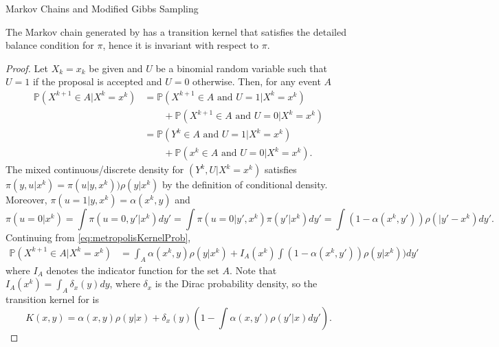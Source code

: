 \begin{chapter}{Markov Chains and Modified Gibbs Sampling}
\begin{prop} \label{prop:metropolisInvariance}
  The Markov chain generated by  has a transition kernel that satisfies the detailed balance condition for $\pi$, hence it is invariant with respect to $\pi$.
\end{prop}
\begin{proof}
Let $X_k=x_k$ be given and $U$ be a binomial random variable such that $U=1$ if the proposal is accepted and $U=0$ otherwise. 
Then, for any event $A$ 
\begin{align}
  \mathbb P\left( X^{k+1} \in A | X^k = x^k \right)
    &= \mathbb P\left( X^{k+1} \in A\text{ and } U = 1 |X^k=x^k \right) \nonumber\\
    &\quad\quad+ \mathbb P\left(X^{k+1} \in A\text{ and } U = 0| X^k=x^k \right) \nonumber \\
    &= \mathbb P\left( Y^k \in A\text{ and } U = 1 |X^k=x^k \right) \nonumber\\
    &\quad\quad+ \mathbb P\left(x^k \in A\text{ and } U = 0| X^k=x^k \right). \label{eq:metropolisKernelProb}
\end{align}
The mixed continuous/discrete density for $(Y^k,U|X^k = x^k)$ satisfies $\pi(y,u|x^k) = \pi(u|y,x^k))\rho(y|x^k)$ by the definition of conditional density.  
Moreover, $\pi(u=1|y,x^k) = \alpha(x^k,y)$ and 
\begin{equation*}
  \pi(u=0|x^k) = \int \pi(u=0,y'|x^k)dy' = \int \pi(u=0|y',x^k)\pi(y'|x^k)dy' = \int (1-\alpha(x^k,y'))\rho(|y'-x^k)dy'.
\end{equation*}
Continuing from \eqref{eq:metropolisKernelProb},
\begin{align}
  \mathbb P\left( X^{k+1} \in A | X^k = x^k \right)
    &= \int_A \alpha(x^k,y)\rho(y|x^k) + I_A(x^k) \int (1 - \alpha(x^k,y'))\rho(y|x^k))dy'
\end{align}
where $I_A$ denotes the indicator function for the set $A$.
Note that $I_A(x^k) = \int_A \delta_x(y)dy$, where $\delta_x$ is the Dirac probability density, so the transition kernel for  is
\begin{equation} \label{eq:metropolisKernel}
  K(x,y) = \alpha(x,y)\rho(y|x) + \delta_x(y) \left(1 - \int \alpha(x,y')\rho(y'|x)dy'\right).
\end{equation}


\end{proof}
\end{chapter}
